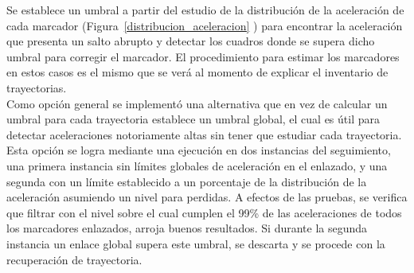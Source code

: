 \begin{itemize}
Se establece un umbral a partir del estudio de la distribución de la aceleración de cada marcador (Figura~\ref{distribucion_aceleracion} ) para encontrar la aceleración que presenta un salto abrupto y detectar los cuadros donde se supera dicho umbral para corregir el marcador. El procedimiento para estimar los marcadores en estos casos es el mismo que se verá al momento de explicar el inventario de trayectorias.\\ 

Como opción general se implementó una alternativa que en vez de calcular un umbral para cada trayectoria establece un umbral global, el cual es útil para detectar aceleraciones notoriamente altas sin tener que estudiar cada trayectoria. Esta opción se logra mediante una ejecución en dos instancias del seguimiento, una primera instancia sin límites globales de aceleración en el enlazado, y una segunda con un límite establecido a un porcentaje de la distribución de la aceleración asumiendo un nivel para perdidas. A efectos de las pruebas, se verifica que filtrar con el nivel sobre el cual cumplen el 99\% de las aceleraciones de todos los marcadores enlazados, arroja buenos resultados. Si durante la segunda instancia un enlace global supera este umbral, se descarta y se procede con la recuperación de trayectoria.


\end{itemize}
